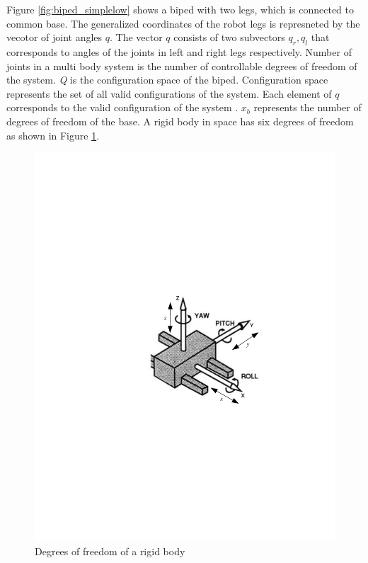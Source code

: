 Figure \ref{fig:biped_simplelow} shows a biped with two legs, which is connected to common base. The generalized coordinates of the robot legs is represneted by the vecotor of joint angles $q$. The vector $q$ consists of two subvectors $q_r,q_l$ that corresponds to angles of the joints in left and right legs respectively. Number of joints in a multi body system is the number of controllable degrees of freedom of the system. \emph{Q} is the configuration space of the biped. Configuration space represents the set of all valid configurations of the system. Each element of $q$ corresponds to the valid configuration of the system \cite[Chapter 2]{mur94}. $x_b$ represents the number of degrees of freedom of the base. A rigid body in space has six degrees of freedom as shown in Figure \ref{fig:rbody}.
\begin{figure}
\begin{center}
\includegraphics[trim= 30mm 100mm 10mm 120mm,scale=0.75]{Bilder/rbody_dof.pdf}
\caption[Degrees of freedom of a rigid body]{Degrees of freedom of a rigid body \footnotemark[1]}
\label{fig:rbody}
\end{center}
\end{figure}
